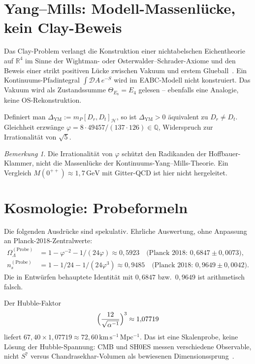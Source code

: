 \documentclass[11pt,a4paper]{article}
\theoremstyle{definition}
\theoremstyle{remark}
\newtheorem{remark}[theorem]{Bemerkung}
\numberwithin{equation}{section}
\begin{document}
\section{Yang--Mills: Modell-Massenlücke, kein Clay-Beweis}

Das Clay-Problem verlangt die Konstruktion einer nichtabelschen Eichentheorie auf $\mathbb{R}^4$ im Sinne der Wightman- oder Osterwalder--Schrader-Axiome und den Beweis einer strikt positiven Lücke zwischen Vakuum und erstem Glueball~\cite{jaffewitten2000}.
Ein Kontinuums-Pfadintegral $\int\mathcal{D}A\,e^{-S}$ wird im EABC-Modell nicht konstruiert.
Das Vakuum wird als Zustandssumme $\Theta_{E_8}=E_4$ gelesen -- ebenfalls eine Analogie, keine OS-Rekonstruktion.

Definiert man $\Delta_{\mathrm{YM}}:=m_P[D_r,D_t]_{\mathcal{H}}$, so ist $\Delta_{\mathrm{YM}}>0$ äquivalent zu $D_r\neq D_t$.
Gleichheit erzwänge $\varphi=8\cdot 49457/(137\cdot 126)\in\mathbb{Q}$, Widerspruch zur Irrationalität von $\sqrt{5}$.

\begin{remark}
Die Irrationalität von $\varphi$ schützt den Radikanden der Hoffbauer-Klammer, nicht die Massenlücke der Kontinuums-Yang--Mills-Theorie.
Ein Vergleich $M(0^{++})\approx 1{,}7\,\mathrm{GeV}$ mit Gitter-QCD ist hier nicht hergeleitet.
\end{remark}

\section{Kosmologie: Probeformeln}

Die folgenden Ausdrücke sind spekulativ.
Ehrliche Auswertung, ohne Anpassung an Planck-2018-Zentralwerte:
\begin{align}
\Omega_\Lambda^{\mathrm{(Probe)}}&=1-\varphi^{-2}-1/(24\varphi)\approx 0{,}5923
\quad\text{(Planck 2018: }0{,}6847\pm 0{,}0073\text{)},\\
n_s^{\mathrm{(Probe)}}&=1-1/24-1/(24\varphi^3)\approx 0{,}9485
\quad\text{(Planck 2018: }0{,}9649\pm 0{,}0042\text{)}.
\end{align}
Die in Entwürfen behauptete Identität mit $0{,}6847$ bzw.\ $0{,}9649$ ist arithmetisch falsch.

Der Hubble-Faktor
\begin{equation}
\Bigl(\frac{12}{\sqrt{\alpha^{-1}}}\Bigr)^3\approx 1{,}07719
\end{equation}
liefert $67{,}40\times 1{,}07719\approx 72{,}60\,\mathrm{km\,s^{-1}\,Mpc^{-1}}$.
Das ist eine Skalenprobe, keine Lösung der Hubble-Spannung:
CMB und SH0ES messen verschiedene Observable, nicht $S^7$ versus Chandrasekhar-Volumen als bewiesenen Dimensionssprung~\cite{planck2018,riess2022}.
\end{document}
